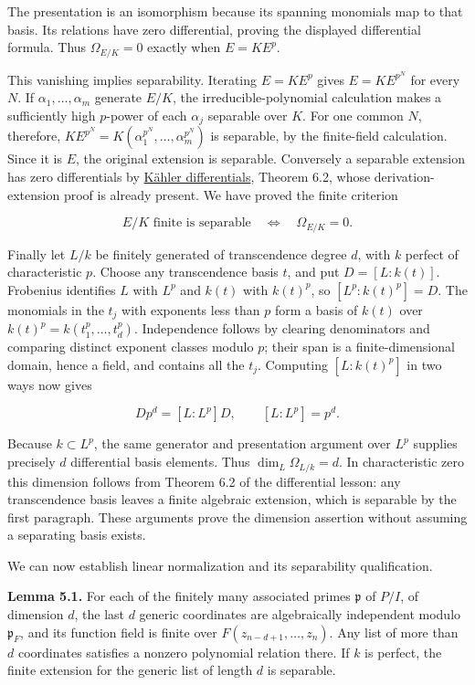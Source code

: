 \documentclass[
]{article}
\begin{document}
The presentation is an isomorphism because its spanning monomials map to
that basis. Its relations have zero differential, proving the displayed
differential formula. Thus \(\Omega_{E/K}=0\) exactly when \(E=K E^p\).

This vanishing implies separability. Iterating \(E=K E^p\) gives
\(E=K E^{p^N}\) for every \(N\). If \(\alpha_1,\ldots,\alpha_m\)
generate \(E/K\), the irreducible-polynomial calculation makes a
sufficiently high \(p\)-power of each \(\alpha_j\) separable over \(K\).
For one common \(N\), therefore,
\(K E^{p^N}=K(\alpha_1^{p^N},\ldots,\alpha_m^{p^N})\) is separable, by
the finite-field calculation. Since it is \(E\), the original extension
is separable. Conversely a separable extension has zero differentials by
\href{../prerequisites/AG-CA/AG-CA-16.html}{Kähler differentials},
Theorem 6.2, whose derivation-extension proof is already present. We
have proved the finite criterion

\[
E/K\text{ finite is separable}\quad\Longleftrightarrow\quad
\Omega_{E/K}=0.
\tag{5a}
\]

Finally let \(L/k\) be finitely generated of transcendence degree \(d\),
with \(k\) perfect of characteristic \(p\). Choose any transcendence
basis \(t\), and put \(D=[L:k(t)]\). Frobenius identifies \(L\) with
\(L^p\) and \(k(t)\) with \(k(t)^p\), so \([L^p:k(t)^p]=D\). The
monomials in the \(t_j\) with exponents less than \(p\) form a basis of
\(k(t)\) over \(k(t)^p=k(t_1^p,\ldots,t_d^p)\). Independence follows by
clearing denominators and comparing distinct exponent classes modulo
\(p\); their span is a finite-dimensional domain, hence a field, and
contains all the \(t_j\). Computing \([L:k(t)^p]\) in two ways now gives

\[
D p^d=[L:L^p]D,\qquad [L:L^p]=p^d.
\]

Because \(k\subset L^p\), the same generator and presentation argument
over \(L^p\) supplies precisely \(d\) differential basis elements. Thus
\(\dim_L\Omega_{L/k}=d\). In characteristic zero this dimension follows
from Theorem 6.2 of the differential lesson: any transcendence basis
leaves a finite algebraic extension, which is separable by the first
paragraph. These arguments prove the dimension assertion without
assuming a separating basis exists.

We can now establish linear normalization and its separability
qualification.

\textbf{Lemma 5.1.} For each of the finitely many associated primes
\(\mathfrak p\) of \(P/I\), of dimension \(d\), the last \(d\) generic
coordinates are algebraically independent modulo \(\mathfrak p_F\), and
its function field is finite over \(F(z_{n-d+1},\ldots,z_n)\). Any list
of more than \(d\) coordinates satisfies a nonzero polynomial relation
there. If \(k\) is perfect, the finite extension for the generic list of
length \(d\) is separable.
\end{document}
